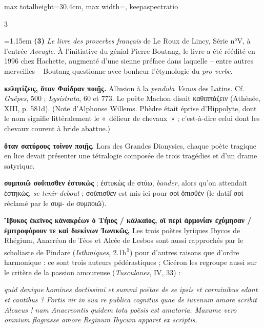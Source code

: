 \documentclass[11pt,twoside]{book}
\newcommand{\italique}[1]{\textit{#1}}
\newcommand{\citComm}[1]{\begin{quoting}[vskip=0.4pt,leftmargin=0.7em,rightmargin=0.2em]#1\end{quoting}}
\newcommand{\latin}[1]{\textit{#1}}
\newcommand{\marqueur}[1]{\textsuperscript{\color{rubricRed}\textbf{#1}}}
\begin{document}
\begin{adjustbox}{max totalheight=30.4cm, max width=\textwidth, keepaspectratio}
\begin{minipage}{\textwidth}
{\begin{multicols}{3}
\par\vspace{1.5pt}
\noindent\hangindent=1.15em {\color{sepiaNote}\textbf{(3)}} \italique{Le livre des proverbes français} de Le Roux de Lincy, Série n°V, à l'entrée \italique{Aveugle}. À l'initiative du génial Pierre Boutang, le livre a été réédité en 1996 chez Hachette, augmenté d'une sienne préface dans laquelle -- entre autres merveilles -- Boutang questionne avec bonheur l'étymologie du \italique{pro-verbe}.
\par\vspace{1.5pt}
 \textbf{κελητίζεις, ὅταν Φαίδραν ποιῇς.} Allusion à la \italique{pendula Venus} des Latins. Cf. \italique{Guêpes}, 500 ; \italique{Lysistrata}, 60 et 773. Le poète Machon disait καθιππάζειν (Athénée, XIII, p. 581d). (Note d'Alphonse Willems. Phèdre était éprise d'Hippolyte, dont le nom signifie littéralement le «~délieur de chevaux~» ; c'est-à-dire celui dont les chevaux courent à bride abattue.)
\par\vspace{1.5pt}
 \textbf{ὅταν σατύρους τοίνυν ποιῇς.} Lors des Grandes Dionysies, chaque poète tragique en lice devait présenter une tétralogie composée de trois tragédies et d'un drame satyrique.
\par\vspace{1.5pt}
 \textbf{συμποιῶ σοὔπισθεν ἐστυκὼς} ; ἐστυκὼς de στύω, \italique{bander}, alors qu'on attendait ἑστηκώς, \italique{se tenir debout} ; σοὔπισθεν est mis ici pour σοί ὄπισθέν (le datif σοί réclamé par le συμ- de συμποιῶ).
\par\vspace{1.5pt}
 \textbf{Ἴβυκος ἐκεῖνος κἀνακρέων ὁ Τήιος / κἀλκαῖος, οἳ περὶ ἁρμονίαν ἐχύμησαν / ἐμιτροφόρουν τε καὶ διεκίνων Ἰωνικῶς,} Les trois poètes lyriques Ibycos de Rhégium, Anacréon de Téos et Alcée de Lesbos sont aussi rapprochés par le scholiaste de Pindare (\italique{Isthmiques}, 2.1b\marqueur{1}) pour d'autres raisons que d'ordre harmonique : ce sont trois auteurs pédérastiques ; Cicéron les regroupe aussi sur le critère de la passion amoureuse (\italique{Tusculanes}, IV, 33) :
\citComm{\latin{quid denique homines doctissimi et summi poëtae de se ipsis et carminibus edant et cantibus ? Fortis vir in sua re publica cognitus quae de iuvenum amore scribit Alcaeus ! nam Anacreontis quidem tota poësis est amatoria. Maxume vero omnium flagrasse amore Reginum Ibycum apparet ex scriptis.}\\
}
\end{multicols}}
\end{minipage}
\end{adjustbox}
\end{document}

